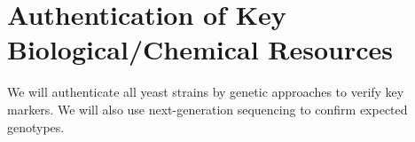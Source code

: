 
\section*{Authentication of Key Biological/Chemical Resources}
We will authenticate all yeast strains by genetic approaches to verify key markers. We will also use next-generation sequencing to confirm expected genotypes.  
